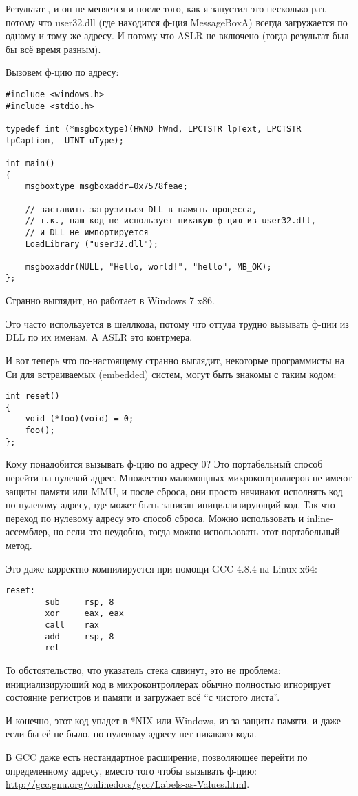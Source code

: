 Результат , и он не меняется и после того, как я запустил это несколько раз, потому что
user32.dll (где находится ф-ция MessageBoxA) всегда загружается по одному и тому же адресу.
И потому что \ac{ASLR} не включено (тогда результат был бы всё время разным).

Вызовем ф-цию  по адресу:

\begin{lstlisting}[style=customc]
#include <windows.h>
#include <stdio.h>

typedef int (*msgboxtype)(HWND hWnd, LPCTSTR lpText, LPCTSTR lpCaption,  UINT uType);

int main()
{
	msgboxtype msgboxaddr=0x7578feae;

	// заставить загрузиться DLL в память процесса,
	// т.к., наш код не использует никакую ф-цию из user32.dll, 
	// и DLL не импортируется
	LoadLibrary ("user32.dll");

	msgboxaddr(NULL, "Hello, world!", "hello", MB_OK);
};
\end{lstlisting}

Странно выглядит, но работает в Windows 7 x86.

Это часто используется в шеллкода, потому что оттуда трудно вызывать ф-ции из DLL по их именам.
А \ac{ASLR} это контрмера.

И вот теперь что по-настоящему странно выглядит, некоторые программисты на Си для встраиваемых (embedded) систем, могут быть
знакомы с таким кодом:

\begin{lstlisting}[style=customc]
int reset()
{
	void (*foo)(void) = 0;
	foo();
};
\end{lstlisting}

Кому понадобится вызывать ф-цию по адресу 0?
Это портабельный способ перейти на нулевой адрес.
Множество маломощных микроконтроллеров не имеют защиты памяти или \ac{MMU}, и после сброса, они просто начинают
исполнять код по нулевому адресу, где может быть записан инициализирующий код.
Так что переход по нулевому адресу это способ сброса.
Можно использовать и inline-ассемблер, но если это неудобно, тогда можно использовать этот портабельный метод.

Это даже корректно компилируется при помощи GCC 4.8.4 на Linux x64:

\begin{lstlisting}[style=customasmx86]
reset:
        sub     rsp, 8
        xor     eax, eax
        call    rax
        add     rsp, 8
        ret
\end{lstlisting}

То обстоятельство, что указатель стека сдвинут, это не проблема: инициализирующий код в микроконтроллерах обычно
полностью игнорирует состояние регистров и памяти и загружает всё ``с чистого листа''.

И конечно, этот код упадет в *NIX или Windows, из-за защиты памяти, и даже если бы её не было, по нулевому адресу
нет никакого кода.

В GCC даже есть нестандартное расширение, позволяющее перейти по определенному адресу, вместо того чтобы вызывать ф-цию:
\url{http://gcc.gnu.org/onlinedocs/gcc/Labels-as-Values.html}.

